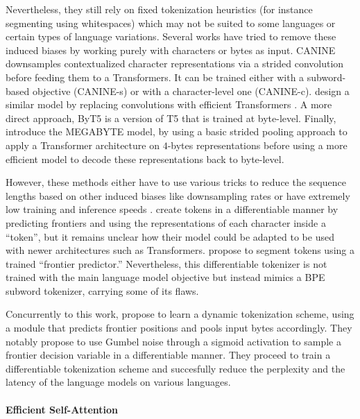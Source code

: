 Nevertheless, they still rely on fixed tokenization heuristics (for instance segmenting using whitespaces) which may not be suited to some languages or certain types of language variations. Several works have tried to remove these induced biases by working purely with characters or bytes as input. CANINE \citep{clark-etal-2022-canine} downsamples contextualized character representations via a strided convolution before feeding them to a Transformers. It can be trained either with a subword-based objective (CANINE-s) or with a character-level one (CANINE-c). \citet{tay2021charformer} design a similar model by replacing convolutions with efficient Transformers \citep{beltagy2020longformer}. A more direct approach, ByT5 \citep{xue-etal-2022-byt5} is a version of T5 that is trained at byte-level. Finally, \citet{yu2023megabyte} introduce the MEGABYTE model, by using a basic strided pooling approach to apply a Transformer architecture on $4$-bytes representations before using a more efficient model to decode these representations back to byte-level.

However, these methods either have to use various tricks to reduce the sequence lengths based on other induced biases like downsampling rates or have extremely low training and inference speeds \citep{xue2022byt5}. \citet{chung2016hierarchical} create tokens in a differentiable manner by predicting frontiers and using the representations of each character inside a ``token'', but it remains unclear how their model could be adapted to be used with newer architectures such as Transformers. \citet{mofijul2022vocabulary} propose to segment tokens using a trained ``frontier predictor.'' Nevertheless, this differentiable tokenizer is not trained with the main language model objective but instead mimics a BPE subword tokenizer, carrying some of its flaws.

Concurrently to this work, \citet{nawrot-etal-2023-efficient} propose to learn a dynamic tokenization scheme, using a module that predicts frontier positions and pools input bytes accordingly. They notably propose to use Gumbel noise \citep{gumbel-orig} through a sigmoid activation to sample a frontier decision variable in a differentiable manner. They proceed to train a differentiable tokenization scheme and succesfully reduce the perplexity and the latency of the language models on various languages.


\paragraph*{Efficient Self-Attention}

